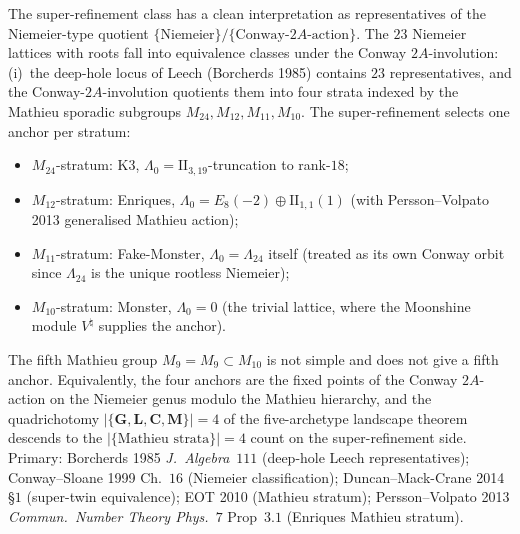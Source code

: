 \begin{remark}
\label{rem:bkm-super-refinement-niemeier-quotient}
The super-refinement class has a clean interpretation as
representatives of the Niemeier-type quotient
$\{\text{Niemeier}\} / \{\text{Conway-}2A\text{-action}\}$.
The $23$ Niemeier lattices with roots fall into equivalence classes
under the Conway $2A$-involution: (i)~the deep-hole locus of
Leech (Borcherds 1985) contains $23$ representatives, and the
Conway-$2A$-involution quotients them into four strata indexed
by the Mathieu sporadic subgroups $M_{24}, M_{12}, M_{11}, M_{10}$.
The super-refinement selects one anchor per stratum:
\begin{itemize}
\item $M_{24}$-stratum: K3, $\Lambda_0 = \mathrm{II}_{3,19}$-truncation
to rank-$18$;
\item $M_{12}$-stratum: Enriques, $\Lambda_0 = E_8(-2)\oplus\mathrm{II}_{1,1}(1)$
(with Persson--Volpato 2013 generalised Mathieu action);
\item $M_{11}$-stratum: Fake-Monster, $\Lambda_0 = \Lambda_{24}$
itself (treated as its own Conway orbit since $\Lambda_{24}$ is the
unique rootless Niemeier);
\item $M_{10}$-stratum: Monster, $\Lambda_0 = 0$ (the trivial lattice,
where the Moonshine module $V^\natural$ supplies the anchor).
\end{itemize}
The fifth Mathieu group $M_9 = M_9 \subset M_{10}$ is not simple and
does not give a fifth anchor. Equivalently, the four anchors are the
fixed points of the Conway $2A$-action on the Niemeier genus modulo
the Mathieu hierarchy, and the quadrichotomy $|\{\mathbf{G}, \mathbf{L},
\mathbf{C}, \mathbf{M}\}| = 4$ of
the five-archetype landscape theorem descends to the
$|\{\text{Mathieu strata}\}| = 4$ count on the super-refinement side.
Primary:
Borcherds 1985 \emph{J.~Algebra}~$111$ (deep-hole Leech
representatives); Conway--Sloane 1999 Ch.~$16$ (Niemeier
classification); Duncan--Mack-Crane 2014 \S$1$ (super-twin
equivalence); EOT 2010 (Mathieu stratum); Persson--Volpato 2013
\emph{Commun.~Number Theory Phys.}~$7$ Prop~$3.1$ (Enriques Mathieu
stratum).
\end{remark}

